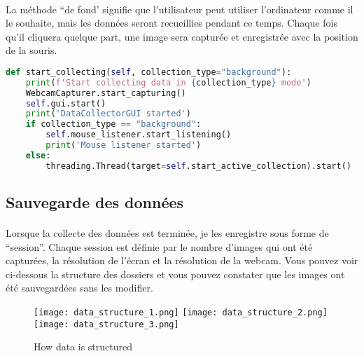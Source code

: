\paragraph{}
La méthode ``de fond' signifie que l'utilisateur peut utiliser l'ordinateur comme il le souhaite, mais les données seront recueillies pendant ce temps.
Chaque fois qu'il cliquera quelque part, une image sera capturée et enregistrée avec la position de la souris.

\begin{lstlisting}[language=Python, caption=Collecte de données]
def start_collecting(self, collection_type="background"):
    print(f'Start collecting data in {collection_type} mode')
    WebcamCapturer.start_capturing()
    self.gui.start()
    print('DataCollectorGUI started')
    if collection_type == "background":
        self.mouse_listener.start_listening()
        print('Mouse listener started')
    else:
        threading.Thread(target=self.start_active_collection).start()
\end{lstlisting}

\subsection{Sauvegarde des données}
\paragraph{}
Lorsque la collecte des données est terminée, je les enregistre sous forme de ``session''.
Chaque session est définie par le nombre d'images qui ont été capturées, la résolution de l'écran et la résolution de la webcam.
Vous pouvez voir ci-dessous la structure des dossiers et vous pouvez constater que les images ont été sauvegardées sans les modifier.

\begin{figure}[H]
    \centering
    \texttt{[image: data\_structure\_1.png]}
    \texttt{[image: data\_structure\_2.png]}
    \texttt{[image: data\_structure\_3.png]}
    \caption{How data is structured}
\end{figure}

